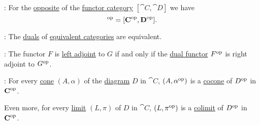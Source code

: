 \begin{proposition}
\begin{thmenum}
     : For the \hyperref[def:opposite_category]{opposite} of the \hyperref[def:functor_category]{functor category} \( [\cat{C}, \cat{D}] \) we have
    \begin{equation*}
      [\cat{C}, \cat{D}]^{\opcat} = [\cat{C}^{\opcat}, \cat{D}^{\opcat}].
    \end{equation*}

     : The \hyperref[def:opposite_category]{duals} of \hyperref[def:category_equivalence]{equivalent categories} are equivalent.

     : The functor \( F \) is \hyperref[def:category_adjunction]{left adjoint} to \( G \) if and only if the \hyperref[def:opposite_functor]{dual functor} \( F^{\operatorname{op}} \) is right adjoint to \( G^{\operatorname{op}} \).

     : For every \hyperref[def:category_of_cones/cone]{cone} \( (A, \alpha) \) of the \hyperref[def:categorical_diagram]{diagram} \( D \) in \( \cat{C} \), \( (A, \alpha^{\operatorname{op}}) \) is a \hyperref[def:category_of_cones/cone]{cocone} of \( D^{\operatorname{op}} \) in \( \operatorname{\mathbf{C}}^{\operatorname{op}} \).

    Even more, for every \hyperref[def:category_of_cones/limit]{limit} \( (L, \pi) \) of \( D \) in \( \cat{C} \), \( (L, \pi^{\operatorname{op}}) \) is a \hyperref[def:category_of_cones/colimit]{colimit} of \( D^{\operatorname{op}} \) in \( \operatorname{\mathbf{C}}^{\operatorname{op}} \).
  \end{thmenum}
\end{proposition}

